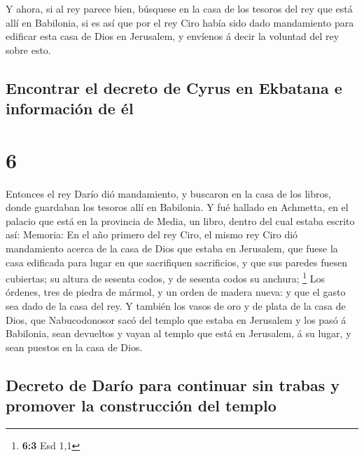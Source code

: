  Y ahora, si al rey parece bien, búsquese en la casa de
los tesoros del rey que está allí en Babilonia, si es así que por el rey
Ciro había sido dado mandamiento para edificar esta casa de Dios en
Jerusalem, y envíenos á decir la voluntad del rey sobre esto.

\hypertarget{encontrar-el-decreto-de-cyrus-en-ekbatana-e-informaciuxf3n-de-uxe9l}{%
\subsection{Encontrar el decreto de Cyrus en Ekbatana e información de
él}\label{encontrar-el-decreto-de-cyrus-en-ekbatana-e-informaciuxf3n-de-uxe9l}}

\hypertarget{section-5}{%
\section{6}\label{section-5}}

 Entonces el rey Darío dió mandamiento, y buscaron en la
casa de los libros, donde guardaban los tesoros allí en Babilonia.
 Y fué hallado en Achmetta, en el palacio que está en la
provincia de Media, un libro, dentro del cual estaba escrito así:
Memoria:  En el año primero del rey Ciro, el mismo rey
Ciro dió mandamiento acerca de la casa de Dios que estaba en Jerusalem,
que fuese la casa edificada para lugar en que sacrifiquen sacrificios, y
que sus paredes fuesen cubiertas; su altura de sesenta codos, y de
sesenta codos su anchura; \footnote{\textbf{6:3} Esd 1,1} 
Los órdenes, tres de piedra de mármol, y un orden de madera nueva: y que
el gasto sea dado de la casa del rey.  Y también los vasos
de oro y de plata de la casa de Dios, que Nabucodonosor sacó del templo
que estaba en Jerusalem y los pasó á Babilonia, sean devueltos y vayan
al templo que está en Jerusalem, á su lugar, y sean puestos en la casa
de Dios.

\hypertarget{decreto-de-daruxedo-para-continuar-sin-trabas-y-promover-la-construcciuxf3n-del-templo}{%
\subsection{Decreto de Darío para continuar sin trabas y promover la
construcción del
templo}\label{decreto-de-daruxedo-para-continuar-sin-trabas-y-promover-la-construcciuxf3n-del-templo}}

